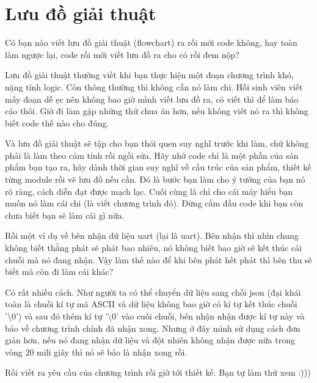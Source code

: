 \section{Lưu đồ giải thuật}

Có bạn nào viết lưu đồ giải thuật (flowchart) ra rồi mới code không, hay toàn làm ngược lại, code rồi mới viết lưu đồ ra cho có rồi đem nộp?

Lưu đồ giải thuật thường viết khi bạn thực hiện một đoạn chương trình khó, nặng tính logic. Còn thông thường thì không cần nó làm chi. Hồi sinh viên viết mấy đoạn dễ ẹc nên không bao giờ mình viết lưu đồ ra, có viết thì để làm báo cáo thôi. Giờ đi làm gặp những thứ chua ăn hơn, nếu không viết nó ra thì không biết code thế nào cho đúng. 

Và lưu đồ giải thuật sẽ tập cho bạn thói quen suy nghĩ trước khi làm, chứ không phải là làm theo cảm tính rồi ngồi sửa. Hãy nhớ code chỉ là một phần của sản phẩm bạn tạo ra, hãy dành thời gian suy nghĩ về cấu trúc của sản phẩm, thiết kế từng module rồi vẽ lưu đồ nếu cần. Đó là bước bạn làm cho ý tưởng của bạn nó rõ ràng, cách diễn đạt được mạch lạc. Cuối cùng là chỉ cho cái máy hiểu bạn muốn nó làm cái chi (là viết chương trình đó). Đừng cắm đầu code khi bạn còn chưa biết bạn sẽ làm cái gì nữa.

Rồi một ví dụ về bên nhận dữ liệu uart (lại là uart). Bên nhận thì nhìn chung không biết thằng phát sẽ phát bao nhiêu, nó không biết bao giờ sẽ kết thúc cái chuỗi mà nó đang nhận. Vậy làm thế nào để khi bên phát hết phát thì bên thu sẽ biết mà còn đi làm cái khác?

Có rất nhiều cách. Như người ta có thể chuyển dữ liệu sang chỗi json (đại khái toàn là chuỗi kí tự mã ASCII và dữ liệu không bao giờ có kí tự kết thúc chuỗi '\textbackslash0') và sau đó thêm kí tự '\textbackslash0' vào cuối chuỗi, bên nhận nhận được kí tự này và báo về chương trình chính đã nhận xong. Nhưng ở đây mình sử dụng cách đơn giản hơn, nếu nó đang nhận dữ liệu và đột nhiên không nhận được nữa trong vòng 20 mili giây thì nó sẽ báo là nhận xong rồi.

Rồi viết ra yêu cầu của chương trình rồi giờ tới thiết kế. Bạn tự làm thử xem :)))

